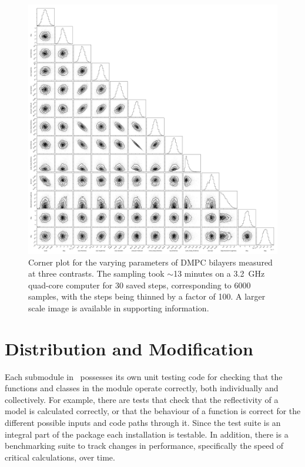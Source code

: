 \documentclass[pdf,preprint]{iucr}
\begin{document}
\begin{figure}
  \includegraphics[width=175mm]{./supporting_information/corner.pdf}
  \caption{Corner plot for the varying parameters of DMPC bilayers measured at three contrasts. The sampling took $\sim$13 minutes on a \SI{3.2}{GHz} quad-core computer for 30 saved steps, corresponding to 6000 samples, with the steps being thinned by a factor of 100. A larger scale image is available in supporting information.}
  \label{fig:corner}
\end{figure}

 
\section{Distribution and Modification}

Each submodule in \ possesses its own unit testing code for checking that the functions and classes in the module operate correctly, both individually and collectively. For example, there are tests that check that the reflectivity of a model is calculated correctly, or that the behaviour of a function is correct for the different possible inputs and code paths through it. Since the test suite is an integral part of the package each installation is testable. In addition, there is a benchmarking suite to track changes in performance, specifically the speed of critical calculations, over time.
 
\end{document}
